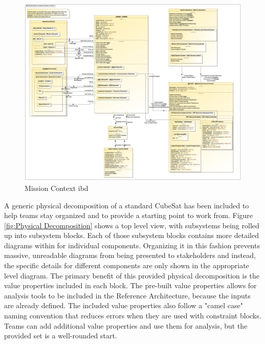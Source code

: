 \begin{figure}[H]
    \centering
    \includegraphics[width=\textwidth]{Thesis/Analysis_and_Results/Analysis and Results Figures/Mission Context ibd.png}
    \caption{Mission Context ibd}
    \label{fig:Mission Context ibd}
\end{figure}

A generic physical decomposition of a standard CubeSat has been included to help teams stay organized and to provide a starting point to work from. Figure \ref{fig:Physical Decomposition} shows a top level view, with subsystems being rolled up into subsystem blocks. Each of those subsystem blocks contains more detailed diagrams within for individual components. Organizing it in this fashion prevents massive, unreadable diagrams from being presented to stakeholders and instead, the specific details for different components are only shown in the appropriate level diagram. The primary benefit of this provided physical decomposition is the value properties included in each block. The pre-built value properties allows for analysis tools to be included in the Reference Architecture, because the inputs are already defined. The included value properties also follow a "camel case" naming convention that reduces errors when they are used with constraint blocks. Teams can add additional value properties and use them for analysis, but the provided set is a well-rounded start.

